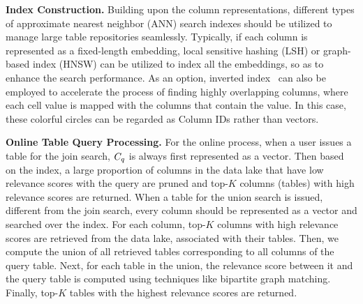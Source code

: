 
\noindent\textbf{Index Construction.} Building upon the  column representations, different types of approximate nearest neighbor (ANN) search indexes should be utilized to manage large table repositories seamlessly. Typically, if each column is represented as a fixed-length embedding, local sensitive hashing (LSH) or graph-based index (HNSW) can be utilized to index all the embeddings, so as to enhance the search performance.
 As an option, inverted index~\cite{} can also be employed  to  accelerate the process of finding highly overlapping columns, where each cell value is mapped with the columns that contain the value. In this case, these colorful circles can be regarded as  Column IDs rather than vectors.






\noindent\textbf{Online Table Query Processing.} For the online process, when a user issues a table for the join search, $C_q$ is always first represented as a vector. Then based on the index, a large proportion of columns in the data lake that have low relevance scores with the query are pruned and top-$K$ columns (tables) with high relevance scores are returned. When a table for the union search is issued, different from the join search, every column should be represented as a vector and searched over the index. For each column, top-$K$ columns with high relevance scores are retrieved from the data lake, associated with their tables. Then, we compute the union of all retrieved tables corresponding to all columns of the query table. Next, for each table in the union, the relevance score between it and the query table is computed using techniques like bipartite graph matching. Finally, top-$K$ tables with the highest relevance scores are returned.



